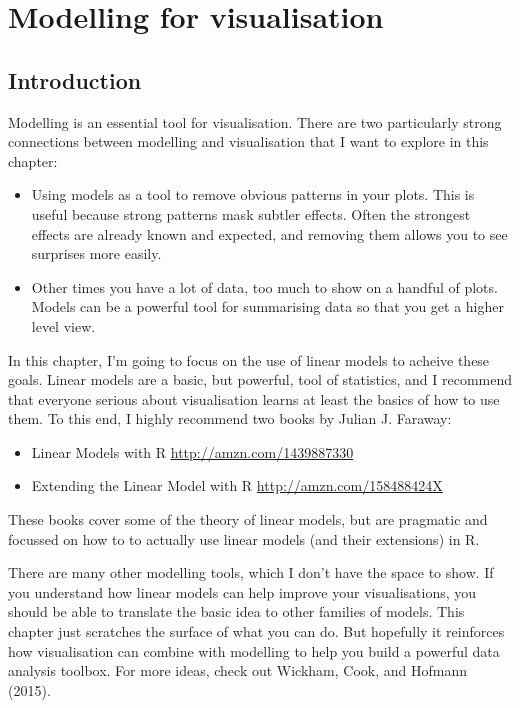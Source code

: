 \chapter{Modelling for visualisation}\label{cha:modelling}

\section{Introduction}

Modelling is an essential tool for visualisation. There are two
particularly strong connections between modelling and visualisation that
I want to explore in this chapter: 

\begin{itemize}
\item
  Using models as a tool to remove obvious patterns in your plots. This
  is useful because strong patterns mask subtler effects. Often the
  strongest effects are already known and expected, and removing them
  allows you to see surprises more easily.
\item
  Other times you have a lot of data, too much to show on a handful of
  plots.\\
   Models can be a powerful tool for summarising data so that you get a
  higher level view.
\end{itemize}

In this chapter, I'm going to focus on the use of linear models to
acheive these goals. Linear models are a basic, but powerful, tool of
statistics, and I recommend that everyone serious about visualisation
learns at least the basics of how to use them. To this end, I highly
recommend two books by Julian J. Faraway:

\begin{itemize}
\tightlist
\item
  Linear Models with R \url{http://amzn.com/1439887330}
\item
  Extending the Linear Model with R \url{http://amzn.com/158488424X}
\end{itemize}

These books cover some of the theory of linear models, but are pragmatic
and focussed on how to to actually use linear models (and their
extensions) in R. 

There are many other modelling tools, which I don't have the space to
show. If you understand how linear models can help improve your
visualisations, you should be able to translate the basic idea to other
families of models. This chapter just scratches the surface of what you
can do. But hopefully it reinforces how visualisation can combine with
modelling to help you build a powerful data analysis toolbox. For more
ideas, check out Wickham, Cook, and Hofmann (2015).

